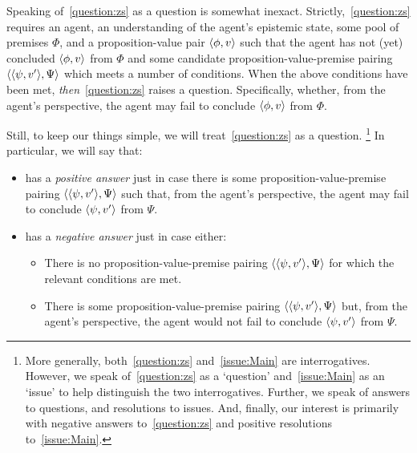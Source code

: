 \begin{note}
  Speaking of~\autoref{question:zs} as a question is somewhat inexact.
  Strictly,~\autoref{question:zs} requires an agent, an understanding of the agent's epistemic state, some pool of premises \(\Phi\), and a proposition-value pair \(\langle \phi, v \rangle\) such that the agent has not (yet) concluded \(\langle \phi, v \rangle\) from \(\Phi\) and some candidate proposition-value-premise pairing \(\langle \langle \psi, v' \rangle, \Psi \rangle\) which meets a number of conditions.
  When the above conditions have been met, \emph{then}~\autoref{question:zs} raises a question.
  Specifically, whether, from the agent's perspective, the agent may fail to conclude \(\langle \phi, v \rangle\) from \(\Phi\).

  Still, to keep our things simple, we will treat~\autoref{question:zs} as a question.%
  \footnote{
    More generally, both~\autoref{question:zs} and~\autoref{issue:Main} are interrogatives.
    However, we speak of~\autoref{question:zs} as a `question' and~\autoref{issue:Main} as an `issue' to help distinguish the two interrogatives.
    Further, we speak of answers to questions, and resolutions to issues.
    And, finally, our interest is primarily with negative answers to~\autoref{question:zs} and positive resolutions to~\autoref{issue:Main}.
  }
  In particular, we will say that:
  \begin{itemize}
  \item
     has a \emph{positive answer} just in case there is some proposition-value-premise pairing \(\langle \langle \psi, v' \rangle, \Psi \rangle\) such that, from the agent's perspective, the agent may fail to conclude \(\langle \psi, v' \rangle\) from \(\Psi\).
  \item
     has a \emph{negative answer} just in case either:
    \begin{itemize}
    \item
      There is no proposition-value-premise pairing \(\langle \langle \psi, v' \rangle, \Psi \rangle\) for which the relevant conditions are met.
    \item
      There is some proposition-value-premise pairing \(\langle \langle \psi, v' \rangle, \Psi \rangle\) but, from the agent's perspective, the agent would not fail to conclude \(\langle \psi, v' \rangle\) from \(\Psi\).
    \end{itemize}
  \end{itemize}
\end{note}

